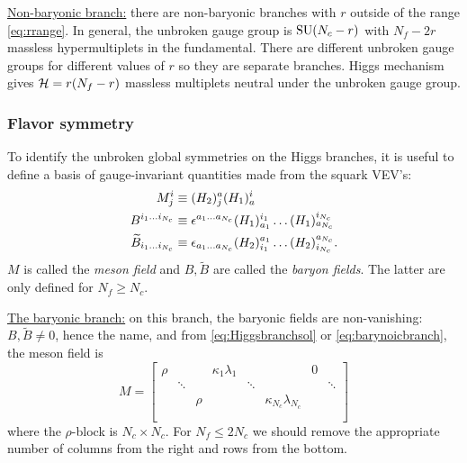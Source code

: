             \underline{Non-baryonic branch:} there are non-baryonic branches with $r$ outside of the range \eqref{eq:rrange}. In general, the unbroken gauge group is $\text{SU}(N_c-r)$ with $N_f-2r$ massless hypermultiplets in the fundamental. There are different unbroken gauge groups for different values of $r$ so they are separate branches. Higgs mechanism gives $\mathcal{H}=r(N_f-r)$ massless multiplets neutral under the unbroken gauge group.

        \subsubsection{Flavor symmetry}

            To identify the unbroken global symmetries on the Higgs branches, it is useful to define a basis of gauge-invariant quantities made from the squark VEV's:
            \begin{align}
                M^i_j &\equiv (H_2)^a_j(H_1)^i_a\\
                B^{i_1\dots i_{N_c}} &\equiv \epsilon^{a_1\dots a_{N_c}}(H_1)^{i_1}_{a_1}\dots(H_1)^{i_{N_c}}_{a_{N_c}}\\
                \widetilde{B}_{i_1\dots i_{N_c}} &\equiv \epsilon_{a_1\dots a_{N_c}}(H_2)^{a_1}_{i_1}\dots(H_2)^{a_{N_c}}_{i_{N_c}}.
            \end{align}
            $M$ is called the \emph{meson field} and $B,\tilde{B}$ are called the \emph{baryon fields}. The latter are only defined for $N_f\geq N_c$.

            \underline{The baryonic branch:} on this branch, the baryonic fields are non-vanishing: $B,\tilde{B}\neq0$, hence the name, and from \eqref{eq:Higgsbranchsol} or \eqref{eq:barynoicbranch}, the meson field is
            \begin{equation}
                M=
                \begin{bmatrix}
                    \rho & & & \kappa_1\lambda_1 & & & 0 & \\
                    & \ddots & & & \ddots & & & \ddots \\
                    & & \rho & & & \kappa_{N_c}\lambda_{N_c} & & \\
                    & & & & & & & \\
                    & & & & & & &
                \end{bmatrix}\label{eq:baryonicbranchmesonfield}
            \end{equation}
            where the $\rho$-block is $N_c\times N_c$. For $N_f\leq 2N_c$ we should remove the appropriate number of columns from the right and rows from the bottom.
            
